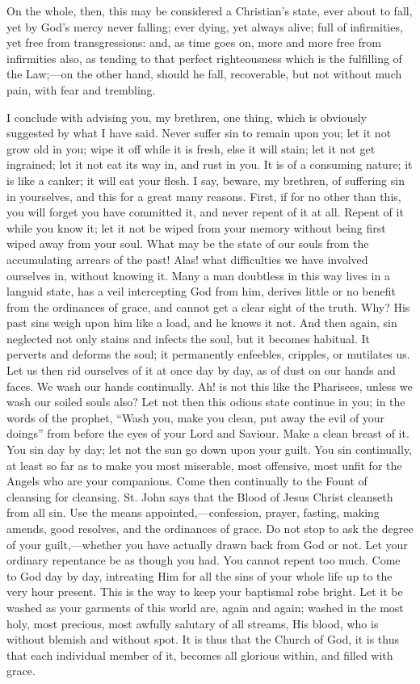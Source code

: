 On the whole, then, this may be considered a Christian's state,
ever about to fall, yet by God's mercy never falling; ever dying, yet
always alive; full of infirmities, yet free from transgressions: and,
as time goes on, more and more free from infirmities also, as tending
to that perfect righteousness which is the fulfilling of the Law;—on
the other hand, should he fall, recoverable, but not without much
pain, with fear and trembling.

I conclude with advising you, my brethren, one thing, which is
obviously suggested by what I have said. Never suffer sin to remain
upon you; let it not grow old in you; wipe it off while it is fresh,
else it will stain; let it not get ingrained; let it not eat its way
in, and rust in you. It is of a consuming nature; it is like a canker;
it will eat your flesh. I say, beware, my brethren, of suffering sin
in yourselves, and this for a great many reasons. First, if for no
other than this, you will forget you have committed it, and never
repent of it at all. Repent of it while you know it; let it not be
wiped from your memory without being first wiped away from your soul.
What may be the state of our souls from the accumulating arrears of
the past! Alas! what difficulties we have involved ourselves in,
without knowing it. Many a man doubtless in this way lives in a
languid state, has a veil intercepting God from him, derives little or
no benefit from the ordinances of grace, and cannot get a clear sight
of the truth. Why? His past sins weigh upon him like a load, and he
knows it not. And then again, sin neglected not only stains and
infects the soul, but it becomes habitual. It perverts and deforms the
soul; it permanently enfeebles, cripples, or mutilates us. Let us then
rid ourselves of it at once day by day, as of dust on our hands and
faces. We wash our hands continually. Ah! is not this like the
Pharisees, unless we wash our soiled souls also? Let not then this
odious state continue in you; in the words of the prophet, ``Wash
you, make you clean, put away the evil of your doings'' from
before the eyes of your Lord and Saviour. Make a clean breast of it.
You sin day by day; let not the sun go down upon your guilt. You sin
continually, at least so far as to make you most miserable, most
offensive, most unfit for the Angels who are your companions. Come
then continually to the Fount of cleansing for cleansing. St. John
says that the Blood of Jesus Christ cleanseth from all sin. Use the
means appointed,—confession, prayer, fasting, making amends, good
resolves, and the ordinances of grace. Do not stop to ask the degree
of your guilt,—whether you have actually drawn back from God or not.
Let your ordinary repentance be as though you had. You cannot repent
too much. Come to God day by day, intreating Him for all the sins of
your whole life up to the very hour present. This is the way to keep
your baptismal robe bright. Let it be washed as your garments of this
world are, again and again; washed in the most holy, most precious,
most awfully salutary of all streams, His blood, who is without
blemish and without spot. It is thus that the Church of God, it is
thus that each individual member of it, becomes all glorious within,
and filled with grace.

